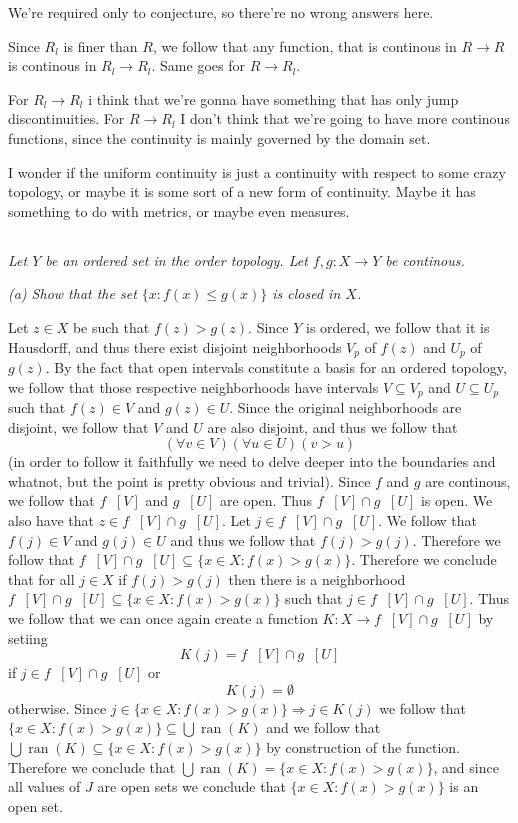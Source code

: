 \documentclass[11pt,oneside,titlepage]{book}
\DeclareMathOperator \inv {^{-1}}
\DeclareMathOperator \ra {\Rightarrow}
\DeclareMathOperator \ran {ran}
\newcommand{\set}[1]{\{ #1 \}}
\begin{document}
We're required only to conjecture, so there're no wrong answers here.

Since $R_l$ is finer than $R$, we follow that any function, that is continous in $R \to R$ is
continous in $R_l \to R_l$. Same goes for $R \to R_l$.

For $R_l \to R_l$ i think that we're gonna have something that has only jump discontinuities.
For $R \to R_l$ I don't think that we're going to have more continous functions, since
the continuity is mainly governed by the domain set. 

I wonder if the uniform continuity is just a continuity with respect to some crazy topology,
or maybe it is some sort of a new form of continuity. Maybe it has something to do with
metrics, or maybe even measures.

\subsection{}

\textit{Let $Y$ be an ordered set in the order topology. Let $f, g: X \to Y$ be
  continous.}

\textit{(a) Show that the set $\set{x: f(x) \leq g(x)}$ is closed in $X$.}

Let $z \in X$ be such that $f(z) > g(z)$. Since $Y$ is ordered, we follow that it is Hausdorff,
and thus there exist disjoint neighborhoods $V_p$ of $f(z)$ and $U_p$ of $g(z)$.
By the fact that open intervals constitute a basis for an ordered topology, we follow that 
those respective neighborhoods have intervals $V \subseteq V_p$ and $U \subseteq U_p$
such that $f(z) \in V$ and $g(z) \in U$. Since the original neighborhoods are
disjoint, we follow that $V$ and $U$ are also disjoint, and thus we follow that
$$(\forall v \in V)(\forall u \in U)(v > u)$$
(in order to follow it faithfully we need to delve deeper into the boundaries and whatnot,
but the point is pretty obvious and trivial).
Since $f$ and $g$
are continous, we follow that $f\inv[V]$ and $g\inv[U]$ are open. Thus $f\inv[V] \cap g\inv[U]$
is open. We also have that $z \in f\inv[V] \cap g\inv[U]$. Let $j \in f\inv[V] \cap g\inv[U]$.
We follow that $f(j) \in V$ and $g(j) \in U$ and thus we follow that $f(j) > g(j)$.
Therefore we follow that $f\inv[V] \cap g\inv[U] \subseteq \set{x \in X: f(x) > g(x)}$.
Therefore we conclude that for all $j \in X$ if $f(j) > g(j)$ then
there is a neighborhood $f\inv[V] \cap g\inv[U] \subseteq \set{x \in X: f(x) > g(x)}$
such that $j \in f\inv[V] \cap g\inv[U]$. Thus we follow that we can once again create a
function $K: X \to f\inv[V] \cap g\inv[U]$ by setiing 
$$K(j) = f\inv[V] \cap g\inv[U]$$
if $j \in f\inv[V] \cap g\inv[U]$ or
$$K(j) = \emptyset$$
otherwise. Since $j \in \set{x \in X: f(x) > g(x)} \ra  j \in K(j)$ we follow that
$\set{x \in X: f(x) > g(x)} \subseteq \bigcup{\ran(K)}$ and we follow that
$ \bigcup{\ran(K)} \subseteq  \set{x \in X: f(x) > g(x)}$ by construction of the function.
Therefore we conclude that $\bigcup{\ran(K)} = \set{x \in X: f(x) > g(x)}$, and since
all values of $J$ are open sets we conclude that $\set{x \in X: f(x) > g(x)}$ is an
open set.
\end{document}
